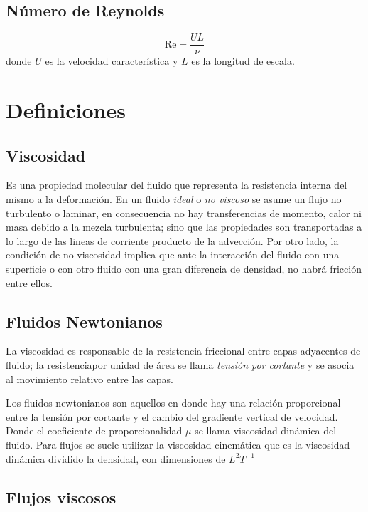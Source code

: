 \documentclass[utf-8,11pt,a4paper]{article}
\begin{document}
\subsection{Número de Reynolds}
\begin{equation}
    \mathrm{Re}=\frac{UL}{\nu}
\end{equation}
donde $U$ es la velocidad característica y $L$ es la longitud de escala.

\section{Definiciones}

\subsection{Viscosidad}

Es una propiedad molecular del fluido que representa la resistencia interna del mismo a la deformación. 
En un fluido \emph{ideal} o \emph{no viscoso} se asume un flujo no turbulento o laminar, en consecuencia no hay transferencias de momento, calor ni masa debido a la mezcla turbulenta; sino que las propiedades son transportadas a lo largo de las lineas de corriente producto de la advección. Por otro lado, la condición de no viscosidad implica que ante la interacción del fluido con una superficie o con otro fluido con una gran diferencia de densidad, no habrá fricción entre ellos.

\subsection{Fluidos Newtonianos}
La viscosidad es responsable de la resistencia friccional entre capas adyacentes de fluido; la resistenciapor unidad de área se llama \emph{tensión por cortante} y se asocia al movimiento relativo entre las capas.

Los fluidos newtonianos son aquellos en donde hay una relación proporcional entre la tensión por cortante y el cambio del gradiente vertical de velocidad. Donde el coeficiente de proporcionalidad $\mu$ se llama viscosidad dinámica del fluido. Para flujos se suele utilizar la viscosidad cinemática que es la viscosidad dinámica dividido la densidad, con dimensiones de $L^2 T^{-1}$

\subsection{Flujos viscosos}
\end{document}
